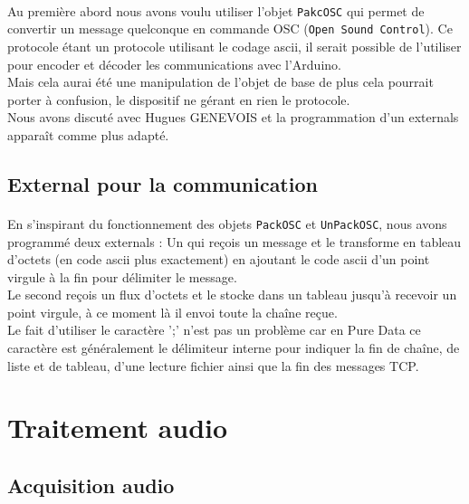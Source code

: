 \documentclass[a4paper, titlepage, oneside, 12pt]{article}%
\begin{document}
\paragraph{}
Au première abord nous avons voulu utiliser l'objet \texttt{PakcOSC} qui permet de convertir un message quelconque en commande OSC (\texttt{Open Sound Control}). Ce protocole étant un protocole utilisant le codage ascii, il serait possible de l'utiliser pour encoder et décoder les communications avec l'Arduino. \\
Mais cela aurai été une manipulation de l'objet de base de plus cela pourrait porter à confusion, le dispositif ne gérant en rien le protocole.\\
Nous avons discuté avec Hugues GENEVOIS et la programmation d'un externals apparaît comme plus adapté.

\subsection{External pour la communication}
\paragraph{}
En s'inspirant du fonctionnement des objets \texttt{PackOSC} et \texttt{UnPackOSC}, nous avons programmé deux externals : Un qui reçois un message et le transforme en tableau d’octets (en code ascii plus exactement) en ajoutant le code ascii d'un point virgule à la fin pour délimiter le message.\\
Le second reçois un flux d'octets et le stocke dans un tableau jusqu’à recevoir un point virgule, à ce moment là il envoi toute la chaîne reçue.\\
Le fait d'utiliser le caractère ';' n'est pas un problème car en Pure Data ce caractère est généralement le délimiteur interne pour indiquer la fin de chaîne, de liste et de tableau, d'une lecture fichier ainsi que la fin des messages TCP.

\section{Traitement audio}
\subsection{Acquisition audio}
\end{document}
